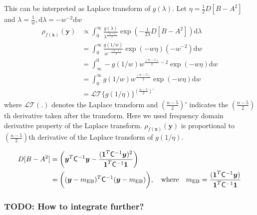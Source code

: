 \documentclass{svjour3}                     %
\newcommand{\bm}[1]{\boldsymbol{#1}}
\newcommand{\dif}[1]{\text{d}{#1}}
\newcommand{\vx}{\bm{x}}
\newcommand{\vy}{\bm{y}}
\newcommand{\vone}{\bm{1}}
\newcommand{\mCInv}{\mathsf{C}^{-1}}
\newcommand{\MLE}{\textup{EB}}
\begin{document}
This can be interpreted as Laplace transform of $g(\lambda)$.
Let $\eta = \frac{1}{2} D [B - A^2] $ and $\lambda = \frac{1}{w}, \dif{\lambda} = -w^{-2} \dif{w}$ 
\begin{align*}
\rho_{f(\vx)}(\vy) 
& \propto \int_{0}^\infty \frac{g(\lambda)}{\lambda^{\frac{(n-1)}{2}}}
\exp \left(  - \frac{1}{2\lambda} D [B - A^2] \right)
\dif{\lambda} 
\\
&= \int_{0}^\infty \frac{g(1/w)  }{w^{-\frac{(n-1)}{2}}}
\exp \left(  - w \eta \right)
(-w^{-2})\dif{w}
\\
&= \int_\infty^0 -g(1/w) w^{\frac{(n-1)}{2} - 2}
\exp \left(  - w \eta \right)
\dif{w}
\\
&= \int_{0}^\infty g(1/w) w^{\frac{(n-5)}{2}}
\exp \left(  - w \eta \right)
\dif{w}
\\
& = \mathcal{LT}\{ g(1/\eta) \}^{(\frac{n-5}{2})'}
\end{align*}
where $\mathcal{LT}(.)$ denotes the Laplace transform and $(\frac{n-5}2)'$ indicates the $(\frac{n-5}2)$th derivative taken after the transform.
Here we used frequency domain derivative property of the Laplace transform. 
$\rho_{f(\vx)}(\vy)$  is proportional to $(\frac{n-5}2)$th derivative of the Laplace transform of $g(1/\eta)$.

\begin{align*}
D [B - A^2] &= \left(\vy^T\mCInv\vy - \frac{(\vone^T\mCInv\vy)^2}{\vone^T\mCInv\vone} \right)
\\
&= \biggl((\vy-m_\MLE)^T \mCInv (\vy-m_\MLE) \biggr), 
\quad \text{where} \quad
m_\MLE=\frac{(\vone^T \mCInv \vy)}{\vone^T\mCInv\vone}
\end{align*}
\subsubsection{TODO: How to integrate further?}






















\end{document}
